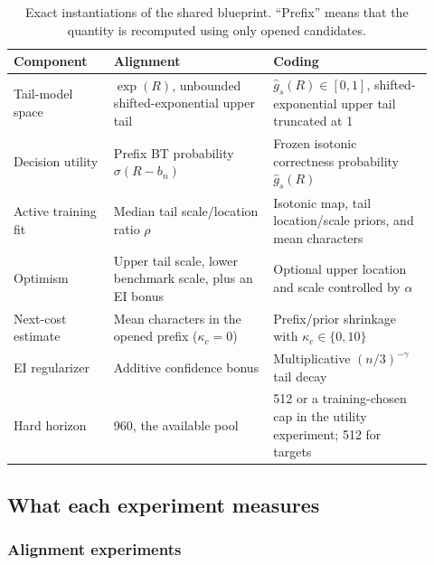 \begin{table}[t]
\centering
\small
\caption{Exact instantiations of the shared blueprint.  ``Prefix'' means that
the quantity is recomputed using only opened candidates.}
\label{tab:pandora-instantiations}
\begin{tabular}{p{0.22\linewidth}p{0.35\linewidth}p{0.35\linewidth}}
\toprule
Component & Alignment & Coding \\
\midrule
Tail-model space & $\exp(R)$, unbounded shifted-exponential upper tail
& $\widehat g_s(R)\in[0,1]$, shifted-exponential upper tail truncated at 1 \\
Decision utility & Prefix BT probability $\sigma(R-b_n)$
& Frozen isotonic correctness probability $\widehat g_s(R)$ \\
Active training fit & Median tail scale/location ratio $\rho$
& Isotonic map, tail location/scale priors, and mean characters \\
Optimism & Upper tail scale, lower benchmark scale, plus an EI bonus
& Optional upper location and scale controlled by $\alpha$ \\
Next-cost estimate & Mean characters in the opened prefix ($\kappa_c=0$)
& Prefix/prior shrinkage with $\kappa_c\in\{0,10\}$ \\
EI regularizer & Additive confidence bonus
& Multiplicative $(n/3)^{-\gamma}$ tail decay \\
Hard horizon & 960, the available pool
& 512 or a training-chosen cap in the utility experiment; 512 for targets \\
\bottomrule
\end{tabular}
\end{table}

\subsection{What each experiment measures}
\label{sec:pandora-experiments}

\subsubsection{Alignment experiments}

